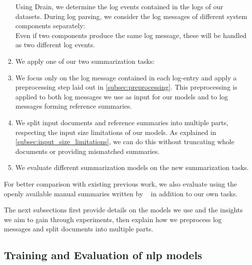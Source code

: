 \begin{enumerate}
      Using Drain, we determine the log events contained in the logs of our datasets.
      During log parsing, we consider the log messages of different system components separately:\\
      Even if two components produce the same log message, these will be handled as two different log events.
\item We apply one of our two summarization tasks:
\item We focus only on the log message contained in each log-entry and apply a preprocessing step laid out in \autoref{subsec:preprocessing}.
      This preprocessing is applied to both log messages we use as input for our models and to log messages forming reference summaries.
\item We split input documents and reference summaries into multiple parts,
      respecting the input size limitations of our models.
      As explained in \autoref{subsec:input_size_limitations},
      we can do this without truncating whole documents or providing mismatched summaries.
\item We evaluate different summarization models on the new summarization tasks.
\end{enumerate}
For better comparison with existing previous work,
we also evaluate using the openly available manual summaries
written by \citeauthor*{log_summary}~\parencite{log_summary} in addition to our own tasks.

The next subsections first provide details on the models we use
and the insights we aim to gain through experiments,
then explain how we preprocess log messages and split documents into multiple parts.

\subsection{Training and Evaluation of \ac*{nlp} models}\label{subsec:approach_models}

